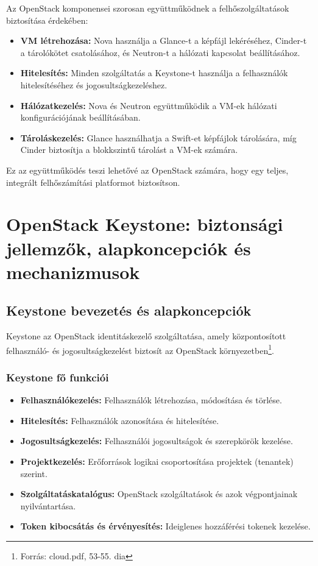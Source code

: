 \documentclass[a4paper,12pt]{article}
\begin{document}
    Az OpenStack komponensei szorosan együttműködnek a felhőszolgáltatások biztosítása érdekében:

    \begin{itemize}
        \item \textbf{VM létrehozása:} Nova használja a Glance-t a képfájl lekéréséhez, Cinder-t a tárolókötet csatolásához, és Neutron-t a hálózati kapcsolat beállításához.
        \item \textbf{Hitelesítés:} Minden szolgáltatás a Keystone-t használja a felhasználók hitelesítéséhez és jogosultságkezeléshez.
        \item \textbf{Hálózatkezelés:} Nova és Neutron együttműködik a VM-ek hálózati konfigurációjának beállításában.
        \item \textbf{Tároláskezelés:} Glance használhatja a Swift-et képfájlok tárolására, míg Cinder biztosítja a blokkszintű tárolást a VM-ek számára.
    \end{itemize}

    Ez az együttműködés teszi lehetővé az OpenStack számára, hogy egy teljes, integrált felhőszámítási platformot biztosítson.

    \newpage


    \section{OpenStack Keystone: biztonsági jellemzők, alapkoncepciók és mechanizmusok}

    \subsection{Keystone bevezetés és alapkoncepciók}

    Keystone az OpenStack identitáskezelő szolgáltatása, amely központosított felhasználó- és jogosultságkezelést biztosít az OpenStack környezetben\footnote{Forrás: cloud.pdf, 53-55. dia}.

    \subsubsection{Keystone fő funkciói}

    \begin{itemize}
        \item \textbf{Felhasználókezelés:} Felhasználók létrehozása, módosítása és törlése.
        \item \textbf{Hitelesítés:} Felhasználók azonosítása és hitelesítése.
        \item \textbf{Jogosultságkezelés:} Felhasználói jogosultságok és szerepkörök kezelése.
        \item \textbf{Projektkezelés:} Erőforrások logikai csoportosítása projektek (tenantek) szerint.
        \item \textbf{Szolgáltatáskatalógus:} OpenStack szolgáltatások és azok végpontjainak nyilvántartása.
        \item \textbf{Token kibocsátás és érvényesítés:} Ideiglenes hozzáférési tokenek kezelése.
    \end{itemize}
\end{document}
